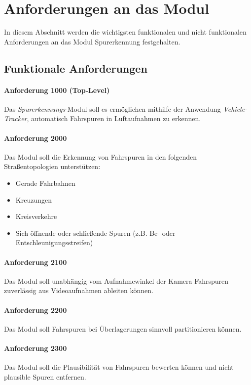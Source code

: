 \section{Anforderungen an das Modul}
\label{sec:requirements}

In diesem Abschnitt werden die wichtigsten funktionalen und nicht funktionalen Anforderungen
an das Modul Spurerkennung festgehalten.

\subsection{Funktionale Anforderungen}

\paragraph{Anforderung 1000 (Top-Level)}
Das \textit{Spurerkennungs}-Modul soll es ermöglichen mithilfe der Anwendung \textit{Vehicle-Tracker},
automatisch Fahrspuren in Luftaufnahmen zu erkennen.

\paragraph{Anforderung 2000}
Das Modul soll die Erkennung von Fahrspuren in den folgenden Straßentopologien unterstützen:

\begin{itemize}
    \item Gerade Fahrbahnen
    \item Kreuzungen
    \item Kreisverkehre
    \item Sich öffnende oder schließende Spuren (z.B. Be- oder Entschleunigungsstreifen)
\end{itemize}

\paragraph{Anforderung 2100}
Das Modul soll unabhängig vom Aufnahmewinkel der Kamera Fahrspuren zuverlässig aus Videoaufnahmen ableiten können.

\paragraph{Anforderung 2200}
Das Modul soll Fahrspuren bei Überlagerungen sinnvoll partitionieren können.

\paragraph{Anforderung 2300}
Das Modul soll die Plausibilität von Fahrspuren bewerten können und nicht plausible Spuren entfernen.

